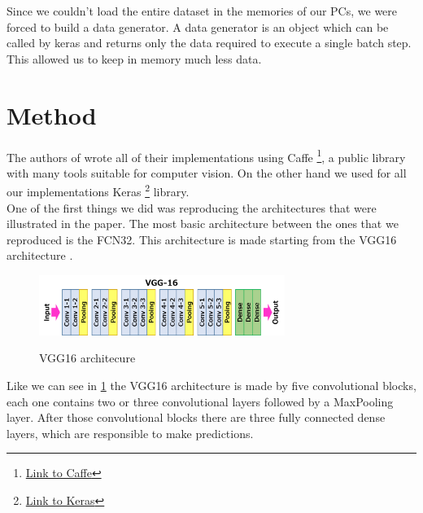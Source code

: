 \documentclass[10pt,twocolumn,letterpaper]{article}
\begin{document}
Since we couldn't load the entire dataset in the memories of our PCs, we were forced to build a data generator. A data generator is an object which can be called by keras and returns only the data required to execute a single batch step. This allowed us to keep in memory much less data.

\section{Method}

The authors of \cite{projectPaper} wrote all of their implementations using Caffe \footnote{\href{https://caffe.berkeleyvision.org/}{Link to Caffe}}, a public library with many tools suitable for computer vision. On the other hand we used for all our implementations Keras \footnote{\href{https://keras.io/}{Link to Keras}} library. \\
One of the first things we did was reproducing the architectures that were illustrated in the paper. The most basic architecture between the ones that we reproduced is the FCN32. This architecture is made starting from the VGG16 architecture \cite{weights}.
\begin{figure}[t]
	\includegraphics[width=8cm]{image/vgg16}
	\label{vgg}
	\centering
	\caption{VGG16 architecure}
\end{figure}
Like we can see in \ref{vgg} the VGG16 architecture is made by five convolutional blocks, each one contains two or three convolutional layers followed by a MaxPooling layer. After those convolutional blocks there are three fully connected dense layers, which are responsible to make predictions.
\end{document}
